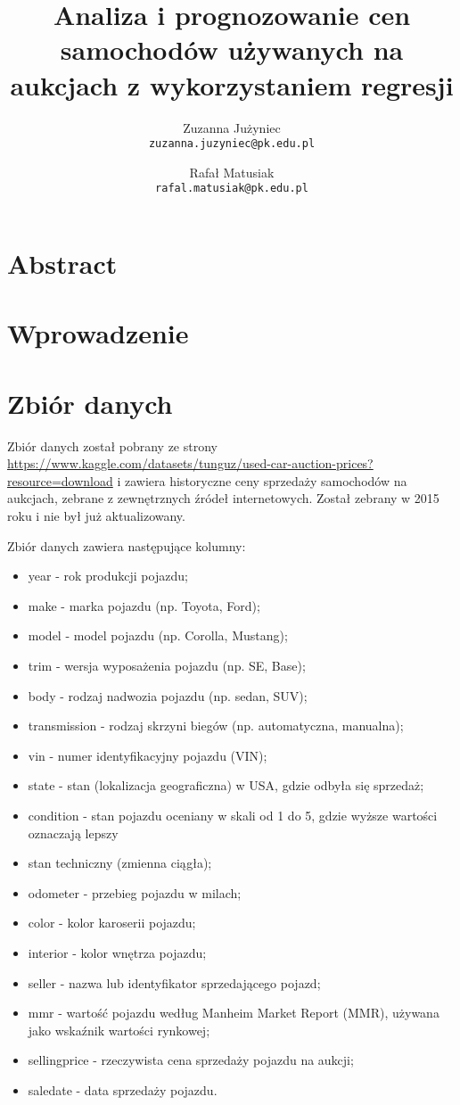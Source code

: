 \documentclass[10pt,letterpaper]{article}
\begin{document}
\title{Analiza i prognozowanie cen samochodów używanych na aukcjach z wykorzystaniem regresji}

\author{Zuzanna Jużyniec\\
{\tt\small zuzanna.juzyniec@pk.edu.pl}
\and
Rafał Matusiak\\
{\tt\small rafal.matusiak@pk.edu.pl}
}
\maketitle

\section{Abstract}
\section{Wprowadzenie}
\section{Zbiór danych}
Zbiór danych został pobrany ze strony \url{https://www.kaggle.com/datasets/tunguz/used-car-auction-prices?resource=download} i zawiera historyczne ceny sprzedaży samochodów na aukcjach, zebrane z zewnętrznych źródeł internetowych. Został zebrany w 2015 roku i nie był już aktualizowany.

Zbiór danych zawiera następujące kolumny:
\begin{itemize}
\item year - rok produkcji pojazdu;
\item make - marka pojazdu (np. Toyota, Ford);
\item model - model pojazdu (np. Corolla, Mustang);
\item trim - wersja wyposażenia pojazdu (np. SE, Base);
\item body - rodzaj nadwozia pojazdu (np. sedan, SUV);
\item transmission - rodzaj skrzyni biegów (np. automatyczna, manualna);
\item vin - numer identyfikacyjny pojazdu (VIN);
\item state - stan (lokalizacja geograficzna) w USA, gdzie odbyła się sprzedaż;
\item condition - stan pojazdu oceniany w skali od 1 do 5, gdzie wyższe wartości oznaczają lepszy \item stan techniczny (zmienna ciągła);
\item odometer - przebieg pojazdu w milach;
\item color - kolor karoserii pojazdu;
\item interior - kolor wnętrza pojazdu;
\item seller - nazwa lub identyfikator sprzedającego pojazd;
\item mmr - wartość pojazdu według Manheim Market Report (MMR), używana jako wskaźnik wartości rynkowej;
\item sellingprice - rzeczywista cena sprzedaży pojazdu na aukcji;
\item saledate - data sprzedaży pojazdu.
\end{itemize}
\end{document}
